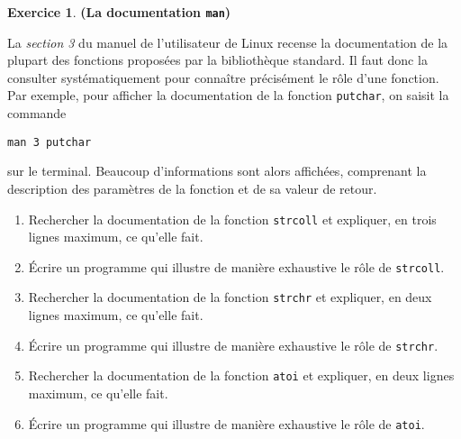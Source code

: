 \documentclass[12pt]{article}
\theoremstyle{definition}
\newtheorem{Exercice}{Exercice}
\begin{document}
\begin{Exercice} {\bf (La documentation {\tt man})}\smallskip

La {\em section 3} du manuel de l'utilisateur de {\sf Linux} recense
la documentation de la plupart des fonctions proposées par la bibliothèque
standard. Il faut donc la consulter systématiquement pour connaître
précisément le rôle d'une fonction. Par exemple, pour afficher
la documentation de la fonction {\tt putchar}, on saisit la commande
\begin{center}
    {\tt man 3 putchar}
\end{center}
sur le terminal. Beaucoup d'informations sont alors affichées,
comprenant la description des paramètres de la fonction et de sa
valeur de retour.

\begin{enumerate}
    \item Rechercher la documentation de la fonction {\tt strcoll} et
    expliquer, en trois lignes maximum, ce qu'elle fait.
    \smallskip

    \item Écrire un programme qui illustre de manière exhaustive
    le rôle de {\tt strcoll}.
    \smallskip

    \item Rechercher la documentation de la fonction {\tt strchr} et
    expliquer, en deux lignes maximum, ce qu'elle fait.
    \smallskip

    \item Écrire un programme qui illustre de manière exhaustive
    le rôle de {\tt strchr}.
    \smallskip

    \item Rechercher la documentation de la fonction {\tt atoi} et
    expliquer, en deux lignes maximum, ce qu'elle fait.
    \smallskip

    \item Écrire un programme qui illustre de manière exhaustive
    le rôle de {\tt atoi}.
\end{enumerate}
\end{Exercice}
\bigskip
\end{document}
